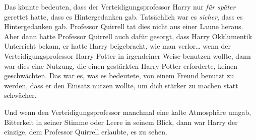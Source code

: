 Das könnte bedeuten, dass der Verteidigungsprofessor Harry nur \emph{für später} gerettet hatte, dass es Hintergedanken gab. Tatsächlich war es \emph{sicher}, dass es Hintergedanken gab. Professor Quirrell tat dies nicht aus einer Laune heraus. Aber dann hatte Professor Quirrell auch dafür gesorgt, dass Harry Okklumentik Unterricht bekam, er hatte Harry beigebracht, wie man verlor… wenn der Verteidigungsprofessor Harry Potter in irgendeiner Weise benutzen wollte, dann war dies eine Nutzung, die einen gestärkten Harry Potter erforderte, keinen geschwächten. Das war es, was es bedeutete, von einem Freund benutzt zu werden, dass er den Einsatz nutzen wollte, um dich stärker zu machen statt schwächer.

Und wenn den Verteidigungsprofessor manchmal eine kalte Atmosphäre umgab, Bitterkeit in seiner Stimme oder Leere in seinem Blick, dann war Harry der einzige, dem Professor Quirrell erlaubte, es zu sehen.

